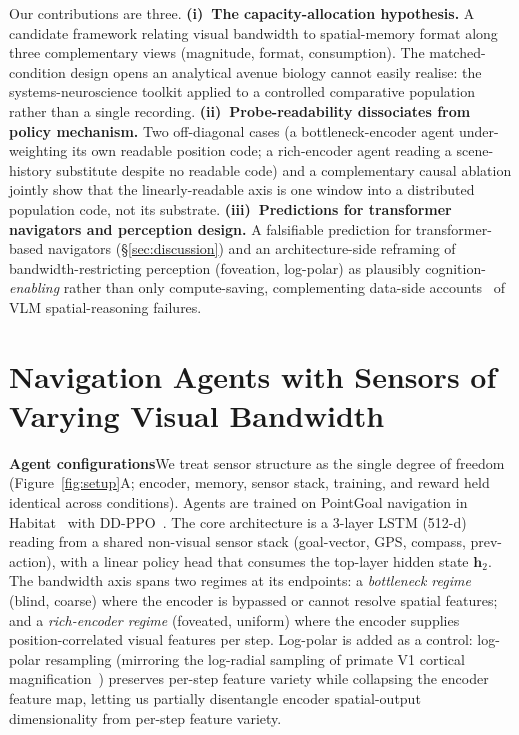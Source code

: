 \documentclass{article}
\begin{document}
\noindent Our contributions are three. \textbf{(i)~The capacity-allocation hypothesis.} A candidate framework relating visual bandwidth to spatial-memory format along three complementary views (magnitude, format, consumption). The matched-condition design opens an analytical avenue biology cannot easily realise: the systems-neuroscience toolkit applied to a controlled comparative population rather than a single recording. \textbf{(ii)~Probe-readability dissociates from policy mechanism.} Two off-diagonal cases (a bottleneck-encoder agent under-weighting its own readable position code; a rich-encoder agent reading a scene-history substitute despite no readable code) and a complementary causal ablation jointly show that the linearly-readable axis is one window into a distributed population code, not its substrate. \textbf{(iii)~Predictions for transformer navigators and perception design.} A falsifiable prediction for transformer-based navigators (§\ref{sec:discussion}) and an architecture-side reframing of bandwidth-restricting perception (foveation, log-polar) as plausibly cognition-\emph{enabling} rather than only compute-saving, complementing data-side accounts~\citep{chen2024spatialvlm} of VLM spatial-reasoning failures.

\section{Navigation Agents with Sensors of Varying Visual Bandwidth}
\label{sec:setup}
\label{sec:methods-setup}

\noindent\textbf{Agent configurations}\quad We treat sensor structure as the single degree of freedom (Figure~\ref{fig:setup}A; encoder, memory, sensor stack, training, and reward held identical across conditions). Agents are trained on PointGoal navigation in Habitat~\citep{savva2019habitat} with DD-PPO~\citep{wijmans2020ddppo}. The core architecture is a 3-layer LSTM (512-d) reading from a shared non-visual sensor stack (goal-vector, GPS, compass, prev-action), with a linear policy head that consumes the top-layer hidden state $\mathbf{h}_2$. The bandwidth axis spans two regimes at its endpoints: a \emph{bottleneck regime} (blind, coarse) where the encoder is bypassed or cannot resolve spatial features; and a \emph{rich-encoder regime} (foveated, uniform) where the encoder supplies position-correlated visual features per step. Log-polar is added as a control: log-polar resampling (mirroring the log-radial sampling of primate V1 cortical magnification~\citep{schwartz1977spatial}) preserves per-step feature variety while collapsing the encoder feature map, letting us partially disentangle encoder spatial-output dimensionality from per-step feature variety.
\end{document}
